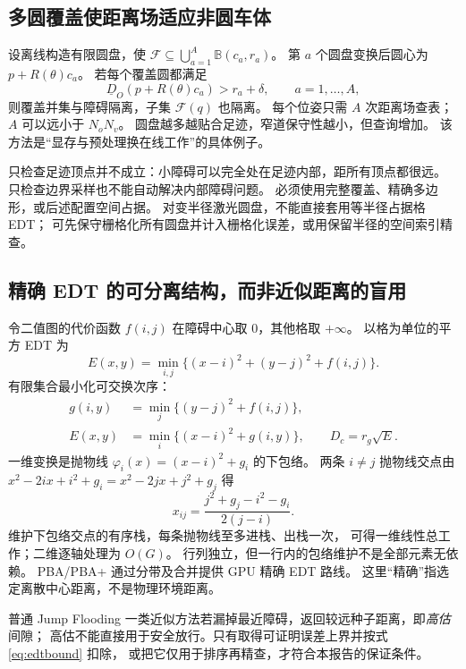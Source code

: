\subsection{多圆覆盖使距离场适应非圆车体}
设离线构造有限圆盘，使
$\mathcal F\subseteq\bigcup_{a=1}^{A}\mathbb B(c_a,r_a)$。
第 $a$ 个圆盘变换后圆心为 $p+R(\theta)c_a$。
若每个覆盖圆都满足
\begin{equation}
\underline D_O(p+R(\theta)c_a)>r_a+\delta,\qquad a=1,\ldots,A,
\label{eq:cover}
\end{equation}
则覆盖并集与障碍隔离，子集 $\mathcal F(q)$ 也隔离。
每个位姿只需 $A$ 次距离场查表；$A$ 可以远小于 $N_oN_v$。
圆盘越多越贴合足迹，窄道保守性越小，但查询增加。
该方法是“显存与预处理换在线工作”的具体例子。

只检查足迹顶点并不成立：小障碍可以完全处在足迹内部，距所有顶点都很远。
只检查边界采样也不能自动解决内部障碍问题。
必须使用完整覆盖、精确多边形，或后述配置空间占据。
对变半径激光圆盘，不能直接套用等半径占据格 EDT；
可先保守栅格化所有圆盘并计入栅格化误差，或用保留半径的空间索引精查。

\subsection{精确 EDT 的可分离结构，而非近似距离的盲用}
令二值图的代价函数 $f(i,j)$ 在障碍中心取 $0$，其他格取 $+\infty$。
以格为单位的平方 EDT 为
\[
E(x,y)=\min_{i,j}\{(x-i)^2+(y-j)^2+f(i,j)\}.
\]
有限集合最小化可交换次序：
\begin{align}
g(i,y)&=\min_j\{(y-j)^2+f(i,j)\},\\
E(x,y)&=\min_i\{(x-i)^2+g(i,y)\},\qquad D_c=r_g\sqrt E.
\end{align}
一维变换是抛物线 $\varphi_i(x)=(x-i)^2+g_i$ 的下包络。
两条 $i\ne j$ 抛物线交点由
$x^2-2ix+i^2+g_i=x^2-2jx+j^2+g_j$ 得
\[
x_{ij}=\frac{j^2+g_j-i^2-g_i}{2(j-i)}.
\]
维护下包络交点的有序栈，每条抛物线至多进栈、出栈一次，
可得一维线性总工作；二维逐轴处理为 $O(G)$。
行列独立，但一行内的包络维护不是全部元素无依赖。
PBA/PBA+ 通过分带及合并提供 GPU 精确 EDT 路线\cite{edt,pba}。
这里“精确”指选定离散中心距离，不是物理环境距离。

普通 Jump Flooding 一类近似方法若漏掉最近障碍，返回较远种子距离，即\emph{高估}间隙；
高估不能直接用于安全放行。只有取得可证明误差上界并按式 \eqref{eq:edtbound} 扣除，
或把它仅用于排序再精查，才符合本报告的保证条件。

